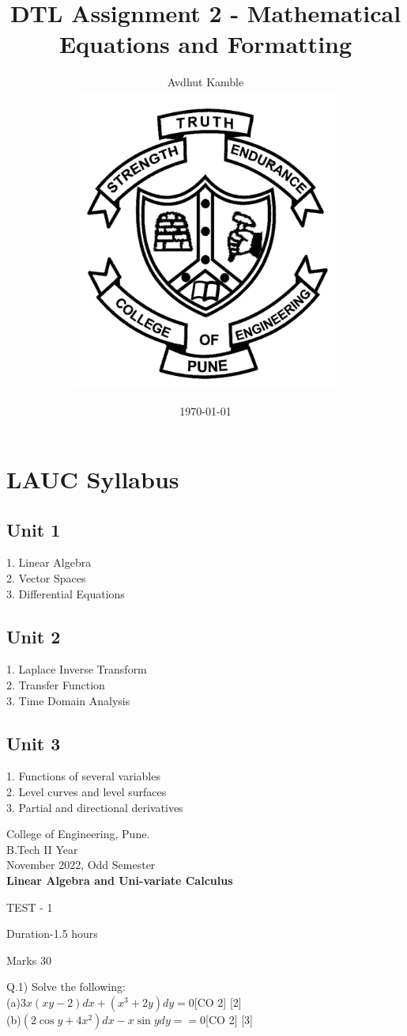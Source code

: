 \documentclass[12pt]{article}
\title{DTL Assignment 2 - Mathematical Equations and Formatting}
\author{Avdhut Kamble  \\		\includegraphics[height=10cm]{COEP.png}}
\date{\today}
\begin{document}
		
\maketitle
{}
\newpage
{}

\title{}



\section{LAUC Syllabus}
\subsection{Unit 1}
1. Linear Algebra\\
2. Vector Spaces\\
3. Differential Equations\\
\subsection{Unit 2}
1. Laplace Inverse Transform\\
2. Transfer Function\\
3. Time Domain Analysis\\
\subsection{Unit 3}
1. Functions of several variables \\
2. Level curves and level surfaces\\
3. Partial and directional derivatives\\


\newpage
\begin{flushleft}
		\bfseries\large
			\begin{center}
	College of Engineering, Pune. \\
		\normalfont\normalsize
	B.Tech II Year \\
		November 2022, Odd Semester
	\bfseries \\
	Linear Algebra and Uni-variate Calculus \qquad
	
		TEST - 1
	\end{center}

	
	\bigskip
	
	\normalfont\normalsize
	
	\raggedright Duration-1.5 hours 
	
	\raggedleft Marks 30  
	\\

	
	\bfseries
	\raggedright
	Q.1) Solve the following:\\
		\normalfont\normalsize
		\hspace{1cm}(a)$3x(xy-2)dx+(x^3+2y)dy=0$\hspace{4.5cm}[CO 2] [2]\\[6 pt]
		\hspace{1cm}(b)$(2\cos{y} + 4x^2)dx -x\sin{y}dy==0$\hspace{4.09cm}[CO 2]    [3]\\
		\end{flushleft} 
	
\end{document}
